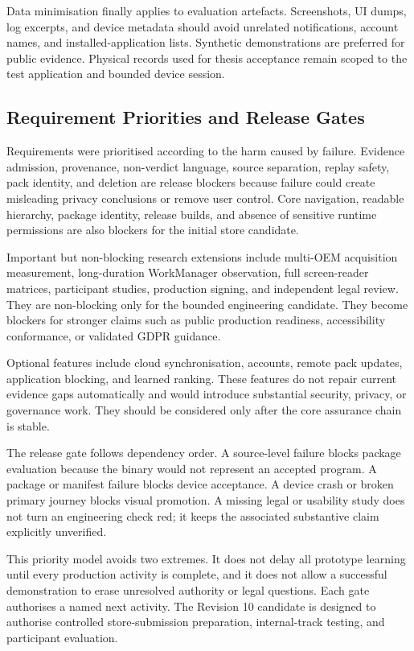 Data minimisation finally applies to evaluation artefacts. Screenshots, UI dumps, log excerpts, and device metadata should avoid unrelated notifications, account names, and installed-application lists. Synthetic demonstrations are preferred for public evidence. Physical records used for thesis acceptance remain scoped to the test application and bounded device session.

\subsection{Requirement Priorities and Release Gates}

Requirements were prioritised according to the harm caused by failure. Evidence admission, provenance, non-verdict language, source separation, replay safety, pack identity, and deletion are release blockers because failure could create misleading privacy conclusions or remove user control. Core navigation, readable hierarchy, package identity, release builds, and absence of sensitive runtime permissions are also blockers for the initial store candidate.

Important but non-blocking research extensions include multi-OEM acquisition measurement, long-duration WorkManager observation, full screen-reader matrices, participant studies, production signing, and independent legal review. They are non-blocking only for the bounded engineering candidate. They become blockers for stronger claims such as public production readiness, accessibility conformance, or validated GDPR guidance.

Optional features include cloud synchronisation, accounts, remote pack updates, application blocking, and learned ranking. These features do not repair current evidence gaps automatically and would introduce substantial security, privacy, or governance work. They should be considered only after the core assurance chain is stable.

The release gate follows dependency order. A source-level failure blocks package evaluation because the binary would not represent an accepted program. A package or manifest failure blocks device acceptance. A device crash or broken primary journey blocks visual promotion. A missing legal or usability study does not turn an engineering check red; it keeps the associated substantive claim explicitly unverified.

This priority model avoids two extremes. It does not delay all prototype learning until every production activity is complete, and it does not allow a successful demonstration to erase unresolved authority or legal questions. Each gate authorises a named next activity. The Revision 10 candidate is designed to authorise controlled store-submission preparation, internal-track testing, and participant evaluation.

